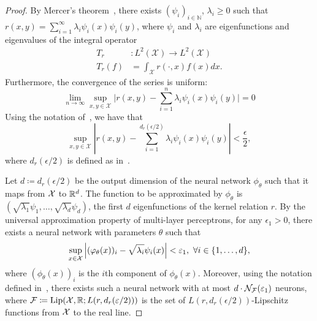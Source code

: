 \begin{proof}
	By Mercer's theorem~\parencite{mercerFunctionsPositive1909, sunMercerTheorem2005, micchelliUniversalKernels2006}, there exists $(\psi_i)_{i \in \mathbb{N}}$, $\lambda_i \geq 0$ such that $r(x,y) = \sum_{i=1}^{\infty}{\lambda_i \psi_i(x) \psi_i(y)}$, where $\psi_i$ and $\lambda_i$ are eigenfunctions and eigenvalues of the integral operator
	\begin{align*}
		T_r&: L^2(\mathcal{X}) \to L^2(\mathcal{X}) \\
		T_r(f) &= \int_{\mathcal{X}}{r(\cdot, x) f(x) dx}.
	\end{align*}
	Furthermore, the convergence of the series is uniform:
	\begin{equation}
		\lim_{n \to \infty} \sup_{x,y \in \mathcal{X}} \lvert r(x,y) - \sum_{i=1}^{n}{\lambda_i \psi_i(x) \psi_i(y) \rvert} = 0
	\end{equation}
	Using the notation of~, we have that
	\begin{equation}\label{eq:proof_mercer_thm_unif_abs_cv}
		\sup_{x,y \in \mathcal{X}} \left\lvert r(x,y) - \sum_{i=1}^{d_r(\epsilon/2)}{\lambda_i \psi_i(x) \psi_i(y)} \right\rvert < \frac{\epsilon}{2},
	\end{equation}
	where $d_r(\epsilon/2)$ is defined as in~.

	Let $d \coloneqq d_r(\epsilon / 2)$ be the output dimension of the neural network $\phi_\theta$ such that it maps from ${\mathcal{X}}$ to $\mathbb{R}^d$. The function to be approximated by $\phi_\theta$ is $(\sqrt{\lambda_1} \psi_1, \ldots, \sqrt{\lambda_{d}} \psi_{d})$, the first $d$ eigenfunctions of the kernel relation $r$. By the universal approximation property of multi-layer perceptrons, for any $\epsilon_1 > 0$, there exists a neural network with parameters $\theta$ such that
	\begin{equation}\label{eq:proof_NN_UAP}
		\sup_{x\in \mathcal{X}}{\abs{(\phi_\theta(x))_i - \sqrt{\lambda_i} \psi_i(x)}} < \epsilon_1, \ \forall i \in \{1, \ldots, d\},
	\end{equation}
	where $(\phi_\theta(x))_i$ is the $i$th component of $\phi_\theta(x)$. Moreover, using the notation defined in~, there exists such a neural network with at most $d \cdot {\mathcal{N}}_{\mathcal{F}}(\varepsilon_1)$ neurons, where ${\mathcal{F}} \coloneq \mathrm{Lip}({\mathcal{X}}, \mathbb{R}; L(r, d_r(\varepsilon/2)))$ is the set of $L(r, d_r(\epsilon/2))$-Lipschitz functions from ${\mathcal{X}}$ to the real line. %


\end{proof}
